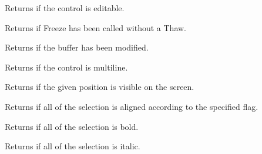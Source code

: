 \label{wxrichtextctrliseditable}


Returns \true if the control is editable.

\label{wxrichtextctrlisfrozen}


Returns \true if Freeze has been called without a Thaw.

\label{wxrichtextctrlismodified}


Returns \true if the buffer has been modified.

\label{wxrichtextctrlismultiline}


Returns \true if the control is multiline.

\label{wxrichtextctrlispositionvisible}


Returns \true if the given position is visible on the screen.

\label{wxrichtextctrlisselectionaligned}


Returns \true if all of the selection is aligned according to the specified flag.

\label{wxrichtextctrlisselectionbold}


Returns \true if all of the selection is bold.

\label{wxrichtextctrlisselectionitalics}


Returns \true if all of the selection is italic.

\label{wxrichtextctrlisselectionunderlined}


